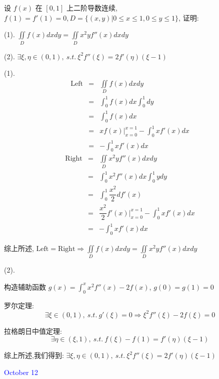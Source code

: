 \begin{example}[][Exam: 36.2.8]
	设 $f(x)$ 在 $[0,1]$ 上二阶导数连续, $f(1)=f'(1)=0, D=\{(x,y)|0\leq x\leq 1,0\leq y\leq 1\}$, 证明:

(1). $\displaystyle{\iint\limits_{D}f(x)dxdy=\iint\limits_{D}x^{2}yf''(x)dxdy}$

(2). $\exists \xi,\eta\in(0,1),\ s.t.\ \xi^{2}f''(\xi) = 2f'(\eta)(\xi-1)$
\end{example}

\begin{solution}

	(1). 
	\begin{eqnarray*}
		\text{Left} & = & \iint\limits_{D}f(x)dxdy\\
				    & = & \int_{0}^{1}f(x)dx\int_{0}^{1}dy\\
		            & = & \int_{0}^{1}f(x)dx\\
		            & = & xf(x)|_{x=0}^{x=1}-\int_{0}^{1}xf'(x)dx\\
		            & = & -\int_{0}^{1}xf'(x)dx
	\end{eqnarray*}
	\begin{eqnarray*}
		\text{Right} & = & \iint\limits_{D}x^2yf''(x)dxdy\\
					 & = & \int_{0}^{1}x^2f''(x)dx\int_{0}^{1}ydy\\
		             & = &\int_{0}^{1}\dfrac{x^2}{2}df'(x)\\
		             & = &\dfrac{x^2}{2}f'(x)|_{x=0}^{x=1}-\int_{0}^{1}xf'(x)dx\\
		             & = &-\int_{0}^{1}xf'(x)dx
	\end{eqnarray*}
	
	综上所述, $\text{Left}=\text{Right} \Rightarrow \displaystyle{\iint\limits_{D}f(x)dxdy=\iint\limits_{D}x^2yf''(x)dxdy}$
	
	(2).
	
	构造辅助函数 $g(x) = \int_{0}^{x} x^{2}f''(x)-2f(x)$, $g(0) = g(1) = 0$
	
	罗尔定理:  
	$$\exists \xi\in(0,1),\ s.t.\ g'(\xi) = 0\Rightarrow \xi^2f''(\xi)-2f(\xi) = 0$$
	
	拉格朗日中值定理:  
	$$\exists\eta\in(\xi,1),\ s.t.\ f(\xi)-f(1)=f'(\eta)(\xi-1)$$
	
	综上所述,我们得到:  $\exists \xi,\eta\in(0,1),\ s.t.\ \xi^2f''(\xi)=2f'(\eta)(\xi-1)$
\end{solution}


\textcolor{blue}{October 12}

